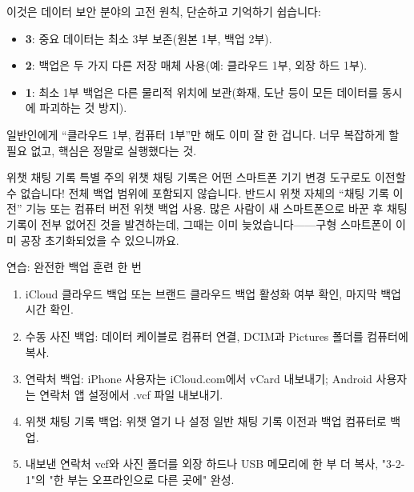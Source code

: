 
이것은 데이터 보안 분야의 고전 원칙, 단순하고 기억하기 쉽습니다:

\begin{itemize}
  \item \textbf{3}: 중요 데이터는 최소 3부 보존(원본 1부, 백업 2부).
  \item \textbf{2}: 백업은 두 가지 다른 저장 매체 사용(예: 클라우드 1부, 외장 하드 1부).
  \item \textbf{1}: 최소 1부 백업은 다른 물리적 위치에 보관(화재, 도난 등이 모든 데이터를 동시에 파괴하는 것 방지).
\end{itemize}

일반인에게 “클라우드 1부, 컴퓨터 1부”만 해도 이미 잘 한 겁니다. 너무 복잡하게 할 필요 없고, 핵심은 정말로 실행했다는 것.

\begin{tcbwarn}{위챗 채팅 기록 특별 주의}
위챗 채팅 기록은 어떤 스마트폰 기기 변경 도구로도 이전할 수 없습니다! 전체 백업 범위에 포함되지 않습니다. 반드시 위챗 자체의 “채팅 기록 이전” 기능 또는 컴퓨터 버전 위챗 백업 사용. 많은 사람이 새 스마트폰으로 바꾼 후 채팅 기록이 전부 없어진 것을 발견하는데, 그때는 이미 늦었습니다——구형 스마트폰이 이미 공장 초기화되었을 수 있으니까요.

\end{tcbwarn}

\begin{tcbpractice}{연습: 완전한 백업 훈련 한 번}
\begin{enumerate}
  \item iCloud 클라우드 백업 또는 브랜드 클라우드 백업 활성화 여부 확인, 마지막 백업 시간 확인.
  \item 수동 사진 백업: 데이터 케이블로 컴퓨터 연결, DCIM과 Pictures 폴더를 컴퓨터에 복사.
  \item 연락처 백업: iPhone 사용자는 iCloud.com에서 vCard 내보내기; Android 사용자는 연락처 앱 설정에서 .vcf 파일 내보내기.
  \item 위챗 채팅 기록 백업: 위챗 열기 나 설정 일반 채팅 기록 이전과 백업 컴퓨터로 백업.
  \item 내보낸 연락처 vcf와 사진 폴더를 외장 하드나 USB 메모리에 한 부 더 복사, "3-2-1"의 "한 부는 오프라인으로 다른 곳에" 완성.
\end{enumerate}

\end{tcbpractice}
